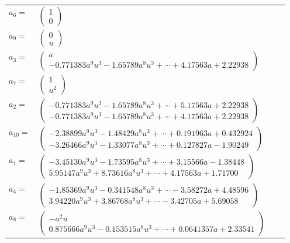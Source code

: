 \documentclass[1p]{elsarticle_modified}
\theoremstyle{definition}
\begin{document}
\begin{tabular}{m{7pt} m{180pt} m{7pt} m{180pt} }
\flushright $a_{6}=$&$\begin{pmatrix}1\\0\end{pmatrix}$ \\
\flushright $a_{9}=$&$\begin{pmatrix}0\\u\end{pmatrix}$ \\
\flushright $a_{3}=$&$\begin{pmatrix}a\\-0.771383 a^{9} u^{3}-1.65789 a^{8} u^{3}+\cdots+4.17563 a+2.22938\end{pmatrix}$ \\
\flushright $a_{7}=$&$\begin{pmatrix}1\\u^2\end{pmatrix}$ \\
\flushright $a_{2}=$&$\begin{pmatrix}-0.771383 a^{9} u^{3}-1.65789 a^{8} u^{3}+\cdots+5.17563 a+2.22938\\-0.771383 a^{9} u^{3}-1.65789 a^{8} u^{3}+\cdots+4.17563 a+2.22938\end{pmatrix}$ \\
\flushright $a_{10}=$&$\begin{pmatrix}-2.38899 a^{9} u^{3}-1.48429 a^{8} u^{3}+\cdots+0.191963 a+0.432924\\-3.26466 a^{9} u^{3}-1.33077 a^{8} u^{3}+\cdots+0.127827 a-1.90249\end{pmatrix}$ \\
\flushright $a_{1}=$&$\begin{pmatrix}-3.45130 a^{9} u^{3}-1.73595 a^{8} u^{3}+\cdots+3.15566 a-1.38448\\5.95147 a^{9} u^{3}+8.73616 a^{8} u^{3}+\cdots+4.17563 a+1.71700\end{pmatrix}$ \\
\flushright $a_{4}=$&$\begin{pmatrix}-1.85369 a^{9} u^{3}-0.341548 a^{8} u^{3}+\cdots-3.58272 a+4.48596\\3.94220 a^{9} u^{3}+3.86768 a^{8} u^{3}+\cdots-3.42705 a+5.69058\end{pmatrix}$ \\
\flushright $a_{8}=$&$\begin{pmatrix}- a^2 u\\0.875666 a^{9} u^{3}-0.153515 a^{8} u^{3}+\cdots+0.0641357 a+2.33541\end{pmatrix}$ \\

\end{tabular}
\end{document}
